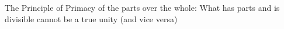 \documentclass[preview]{standalone}
\begin{document}
\begin{center}
The Principle of Primacy of the parts over the whole: What has parts and is divisible cannot be a true unity (and vice versa)
\end{center}
\end{document}
